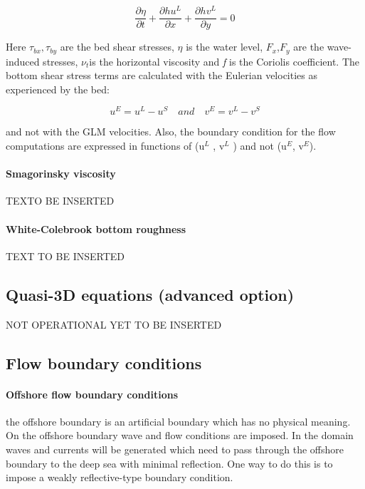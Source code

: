 \begin{equation} \label{2.44)} 
\frac{\partial \eta }{\partial t} +\frac{\partial hu^{L} }{\partial x} +\frac{\partial hv^{L} }{\partial y} =0 
\end{equation} 

Here $\tau _{bx} ,\tau _{by} $ are the bed shear stresses, $\eta $ is the water level, $F_{x} $,$F_{y} $ are the wave-induced stresses, $\nu _{t} $is the horizontal viscosity and \textit{f} is the Coriolis coefficient. The bottom shear stress terms are calculated with the Eulerian velocities as experienced by the bed:

\begin{equation} \label{2.45)} 
u^{E} =u^{L} -u^{S} \quad and\quad v^{E} =v^{L} -v^{S}  
\end{equation} 

and not with the GLM velocities. Also, the boundary condition for the flow computations are expressed in functions of (u${}^{L}$ , v${}^{L}$ ) and not (u${}^{E}$, v${}^{E}$).

\paragraph{Smagorinsky viscosity}
TEXTO BE INSERTED

\paragraph{White-Colebrook bottom roughness}
TEXT TO BE INSERTED

\subsection{ Quasi-3D equations (advanced option)}
NOT OPERATIONAL YET TO BE INSERTED

\subsection{ Flow boundary conditions}
\paragraph{Offshore flow boundary conditions}

the offshore boundary is an artificial boundary which has no physical meaning. On the offshore boundary wave and flow conditions are imposed. In the domain waves and currents will be generated which need to pass through the offshore boundary to the deep sea with minimal reflection. One way to do this is to impose a weakly reflective-type boundary condition. 

